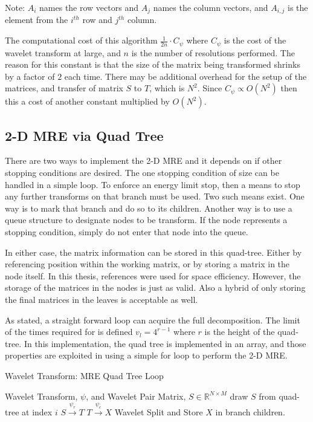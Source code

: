Note: $A_i$ names the row vectors and $A_j$ names the column vectors, and $A_{i,j}$ is the element from the $i^{th}$ row and $j^{th}$ column.

The computational cost of this algorithm $\frac{1}{2n}\cdot C_\psi$  where $C_\psi$ is the cost of the wavelet transform at large, and $n$ is the number of resolutions performed.  The reason for this constant is that the size of the matrix being transformed shrinks by a factor of $2$ each time.  There may be additional overhead for the setup of the matrices, and transfer of matrix $S$ to $T$, which is $N^2$.  Since $C_\psi \propto O(N^2)$ then this a cost of another constant multiplied by $O(N^2)$.

\subsection {2-D MRE via Quad Tree}
There are two ways to implement the 2-D MRE and it depends on if other stopping conditions are desired.  The one stopping condition of size can be handled in a simple loop.  To enforce an energy limit stop, then a means to stop any further transforms on that branch must be used.   Two such means exist.   One way is to mark that branch and do so to its children.  Another way is to use a queue structure to designate nodes to be transform.  If the node represents a stopping condition, simply do not enter that node into the queue. 

In either case, the matrix information can be stored in this quad-tree.  Either by referencing position within the working matrix, or by storing a matrix in the node itself.  In this thesis, references were used for space efficiency.  However, the storage of the matrices in the nodes is just as valid.  Also a hybrid of only storing the final matrices in the leaves is acceptable as well.  

As stated, a straight forward loop can acquire the full decomposition.  The limit of the times required for is defined $v_l = 4^{r-1} $  where $r$ is the height of the quad-tree.  In this implementation, the quad tree is implemented in an array, and those properties are exploited in using a simple for loop to perform the 2-D MRE.
\begin{algorithm}
\caption{Wavelet Transform: MRE Quad Tree Loop }
\label{mreqtloop}
\begin{algorithmic}
\REQUIRE Wavelet Transform, $\psi$, and Wavelet Pair
\REQUIRE Matrix, $S \in {\mathbb R}^{N\times M}$
\STATE draw $S$ from quad-tree at index $i$
\STATE $S \stackrel{\psi_r}{\to} T$
\STATE $T \stackrel{\psi_c}{\to} X$
\STATE Wavelet Split and Store $X$ in branch children.
\ENDFOR
\end{algorithmic}
\end{algorithm}

